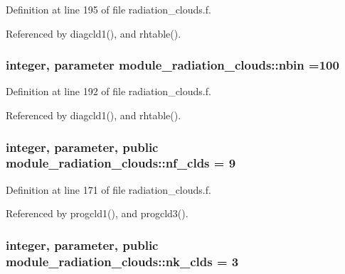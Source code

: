 Definition at line 195 of file radiation\+\_\+clouds.\+f.



Referenced by diagcld1(), and rhtable().

\subsubsection[{\texorpdfstring{nbin}{nbin}}]{\setlength{\rightskip}{0pt plus 5cm}integer, parameter module\+\_\+radiation\+\_\+clouds\+::nbin =100\hspace{0.3cm}{\ttfamily [private]}}\hypertarget{group__module__radiation__clouds_gad2947b3c0a8382fbe12b76dd68b290e0}{}\label{group__module__radiation__clouds_gad2947b3c0a8382fbe12b76dd68b290e0}


Definition at line 192 of file radiation\+\_\+clouds.\+f.



Referenced by diagcld1(), and rhtable().

\subsubsection[{\texorpdfstring{nf\+\_\+clds}{nf_clds}}]{\setlength{\rightskip}{0pt plus 5cm}integer, parameter, public module\+\_\+radiation\+\_\+clouds\+::nf\+\_\+clds = 9}\hypertarget{group__module__radiation__clouds_ga66cf0f94619a3d865b0c593197a30576}{}\label{group__module__radiation__clouds_ga66cf0f94619a3d865b0c593197a30576}


Definition at line 171 of file radiation\+\_\+clouds.\+f.



Referenced by progcld1(), and progcld3().

\subsubsection[{\texorpdfstring{nk\+\_\+clds}{nk_clds}}]{\setlength{\rightskip}{0pt plus 5cm}integer, parameter, public module\+\_\+radiation\+\_\+clouds\+::nk\+\_\+clds = 3}\hypertarget{group__module__radiation__clouds_ga2739168b8205ee860eb8a160ea722a44}{}\label{group__module__radiation__clouds_ga2739168b8205ee860eb8a160ea722a44}


